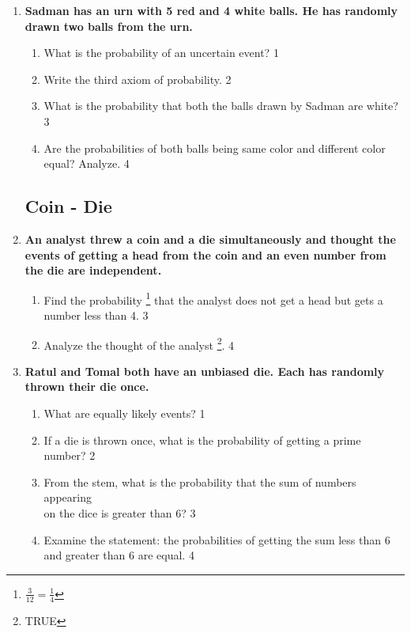 \documentclass[a4paper,oneside, margin=1.4in]{book}
\begin{document}
\begin{enumerate}
\item
	  \textbf{Sadman has an urn with 5 red and 4 white balls. He has randomly drawn two balls from the urn.} 
  
  \begin{enumerate}
    \item
	What is the probability of an uncertain event? \hfill 1
    \item
	Write the third axiom of probability. \hfill 2
    \item  
	What is the probability that both the balls drawn by Sadman are white? \hfill 3
    \item
	Are the probabilities of both balls being same color and different color equal? Analyze. \hfill 4
  \end{enumerate}
  
  \subsection{Coin - Die}
  
   \item
	  \textbf{An analyst threw a coin and a die simultaneously and thought the events of getting a head from the coin and an even number from the die are independent.} 
  
  \begin{enumerate}
    \item  
	Find the probability \footnote{$\frac{3}{12} = \frac14$} that the analyst does not get a head but gets a number less than 4. \hfill 3
    \item
	Analyze the thought of the analyst \footnote{TRUE}. \hfill 4
  \end{enumerate}

  
       \item
	  \textbf{Ratul and Tomal both have an unbiased die. Each has randomly thrown their die once.} 
  
  \begin{enumerate}
    \item
	What are equally likely events? \hfill 1
    \item
	If a die is thrown once, what is the probability of getting a prime 
	number? \hfill 2
    \item  
	From the stem, what is the probability that the sum of numbers appearing
	\\ on the dice is greater than 6? \hfill 3
    \item
	Examine the statement: the probabilities of getting the sum less than 6 and greater 
	than 6 are equal. \hfill 4
  \end{enumerate}


\end{enumerate}
\end{document}
